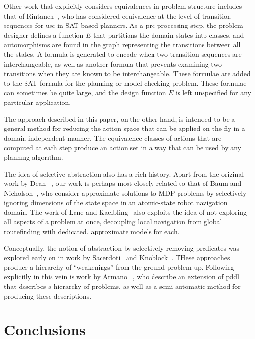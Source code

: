 Other work that explicitly considers equivalences in problem structure
includes that of Rintanen~, who has considered
equivalence at the level of transition sequences for use in SAT-based
planners. As a pre-processing step, the problem designer defines a
function $E$ that partitions
the domain states into classes, and automorphisms are found in the
graph representing the transitions between all the states.
A formula is generated to encode when two transition sequences are
interchangeable, as well as another formula that prevents examining
two transitions when they are known to be interchangeable. These
formulae are added to the SAT formula for the planning or model
checking problem. These formulae can sometimes be quite large, and the
design function $E$ is left unspecified for any particular application.



 The approach described in this paper, on the other hand, is intended
 to be a general method for reducing the action space that can be
 applied on the fly in a domain-independent manner.  The equivalence
 classes of actions that are computed at each step produce an action
 set in a way that can be used by any planning algorithm.  


The idea of selective abstraction also has a rich history. Apart from the original work by Dean \etal\ , our work is perhaps most closely related to that of Baum and Nicholson~, who consider approximate solutions to MDP problems by selectively ignoring dimensions of the state space in an atomic-state robot navigation domain. The work of Lane and Kaelbling~ also exploits the idea of not exploring all aspects of a problem at once, decoupling local navigation from global routefinding with dedicated, approximate models for each. 

Conceptually, the notion of abstraction by selectively removing predicates was explored early on in work by Sacerdoti~ and Knoblock~. THese approaches produce a hierarchy of ``weakenings'' from the ground problem up. Following explicitly in this vein is work by Armano \etal\ , who describe an extension of {\sc pddl}  that describes a hierarchy of problems, as well as a semi-automatic method for producing these descriptions.
 


\section{Conclusions}
 


\vskip 0.2in









